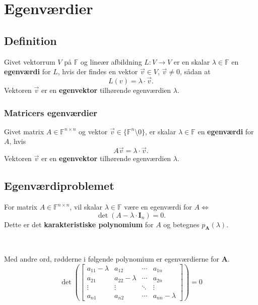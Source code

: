 \section{Egenværdier}
\subsection{Definition}
Givet vektorrum $V$ på $\mathbb{F}$ og lineær afbildning $L: V \to V$ 
er en skalar $\lambda \in \mathbb{F}$ en \textbf{egenværdi} for $L$, hvis der findes en vektor $\vec{v} \in V$, $\vec{v} \neq 0$, sådan at
\[L(v) = \lambda \cdot \vec{v}.\]
Vektoren $\vec{v}$ er en \textbf{egenvektor} tilhørende egenværdien $\lambda$.


\subsubsection{Matricers egenværdier}
Givet matrix $A \in \mathbb{F}^{n \times n}$ og vektor $\vec{v} \in \{ \mathbb{F}^n \setminus 0 \}$, er skalar $\lambda \in \mathbb{F}$ en \textbf{egenværdi} for $A$, hvis
\[A \vec{v} = \lambda \cdot \vec{v}.\]
Vektoren $\vec{v}$ er en \textbf{egenvektor} tilhørende egenværdien $\lambda$.


\subsection{Egenværdiproblemet}
For matrix $A \in \mathbb{F}^{n \times n}$, vil skalar $\lambda \in \mathbb{F}$ være en egenværdi for $A \iff$
\[\det(A - \lambda \cdot \mathbf{I}_n) = 0.\]
Dette er det \textbf{karakteristiske polynomium} for $A$ og betegnes $p_{\mathbf{A}}(\lambda)$.

\

Med andre ord, rødderne i følgende polynomium er egenværdierne for $\mathbf{A}$.
\[
\det \left(
    \begin{bmatrix}
        a_{11} - \lambda & a_{12} & \cdots & a_{1n} \\
        a_{21} & a_{22} - \lambda & \cdots & a_{2n} \\
        \vdots & \vdots & \ddots & \vdots \\
        a_{n1} & a_{n2} & \cdots & a_{nn} - \lambda 
    \end{bmatrix}\right) = 0
\]

